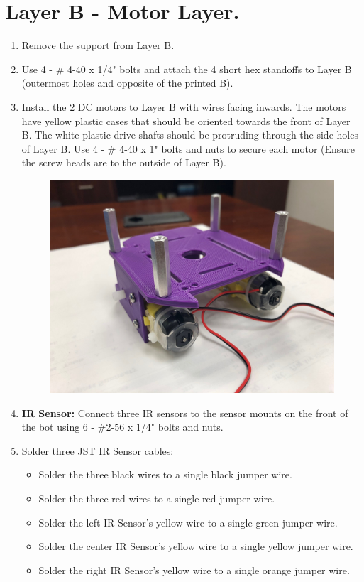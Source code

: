 \documentclass{handout}
\begin{document}
	\section{Layer B - Motor Layer.}
	\begin{enumerate}
		\item Remove the support from Layer B.
		\item Use 4 - \# 4-40 x 1/4" bolts and attach the 4 short hex standoffs to Layer B (outermost holes and opposite of the printed B).
		\item Install the 2 DC motors to Layer B with wires facing inwards. The motors have yellow plastic cases that should be oriented towards the front of Layer B. The white plastic drive shafts should be protruding through the side holes of Layer B. Use 4 - \# 4-40 x 1" bolts and nuts to secure each motor (Ensure the screw heads are to the outside of Layer B).
		
		\begin{figure} [H]
			\centering
			\includegraphics[width=.75\textwidth]{3.jpg}
		\end{figure}
		
		\item \textbf{IR Sensor:} Connect three IR sensors to the sensor mounts on the front of the bot using 6 - \#2-56 x 1/4" bolts and nuts.

		\item Solder three JST IR Sensor cables:
		\begin{itemize}
			\item Solder the three black wires to a single black jumper wire.
			\item Solder the three red wires to a single red jumper wire.
			\item Solder the left IR Sensor's yellow wire to a single green jumper wire.
			\item Solder the center IR Sensor's yellow wire to a single yellow jumper wire.
			\item Solder the right IR Sensor's yellow wire to a single orange jumper wire.
		\end{itemize}
	

\end{enumerate}
\end{document}
